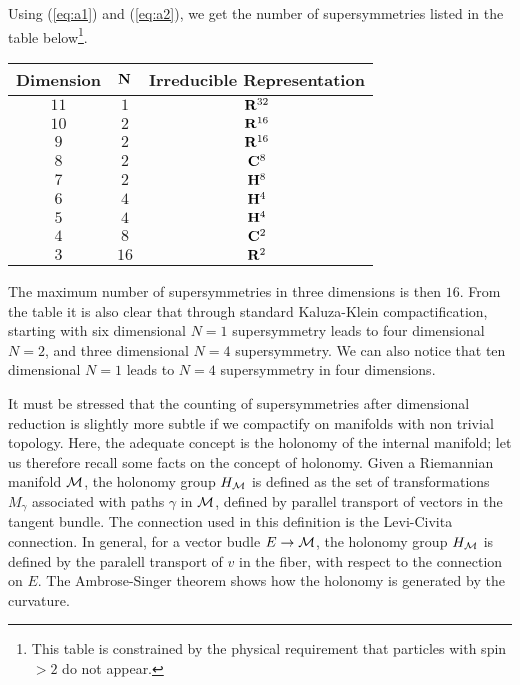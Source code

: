 Using (\ref{eq:a1}) and (\ref{eq:a2}), we get the number of
supersymmetries listed in the table below\footnote{This table 
is constrained by the physical requirement that
particles with spin $>2$ do not appear.}.


\begin{center}

\begin{tabular}{|c|c|c|}     \hline\hline
	 {\bf Dimension  }      & ${\bf N}$  & {\bf Irreducible Representation}   \\ \hline
	 $11$                   & $1$        & ${\bf R}^{32}$   \\
	 $10$                   & $2$        & ${\bf R}^{16}$   \\
	 $9$                    & $2$        & ${\bf R}^{16}$   \\
	 $8$                    & $2$        & ${\bf C}^8$   \\
	 $7$                    & $2$        & ${\bf H}^8$   \\
	 $6$                    & $4$        & ${\bf H}^4$   \\ 
	 $5$                    & $4$        & ${\bf H}^4$   \\         
	 $4$                    & $8$        & ${\bf C}^2$   \\
	 $3$                    & $16$       & ${\bf R}^2$   \\ \hline\hline

\end{tabular}
\label{tab:a1}
\end{center}

  
The maximum number of supersymmetries in three dimensions is then
$16$. From the table it is also clear that through
standard Kaluza-Klein compactification, starting with six
dimensional $N\!=\!1$ supersymmetry leads to four dimensional
$N\!=\!2$, and three dimensional $N\!=\!4$ supersymmetry. We can
also notice that ten dimensional $N\!=\!1$ leads to $N\!=\!4$
supersymmetry in four dimensions.
  
It must be stressed that the counting of supersymmetries after
dimensional reduction is slightly more subtle if we compactify on
manifolds with non trivial topology. Here, the adequate concept
is the holonomy of the internal manifold; let us therefore recall
some facts on the concept of holonomy. Given a Riemannian
manifold ${\cal M}$, the holonomy group $H_{\cal M}$ is defined
as the set of transformations $M_{\gamma}$ associated with paths
$\gamma$ in ${\cal M}$, defined by parallel transport of vectors
in the tangent bundle. The connection used in this definition is
the Levi-Civita connection. In general, for a vector budle $E
\rightarrow {\cal M}$, the holonomy group $H_{\cal M}$ is defined
by the paralell transport of $v$ in the fiber, with respect to
the connection on $E$. The Ambrose-Singer theorem shows how the
holonomy is generated by the curvature.
  
